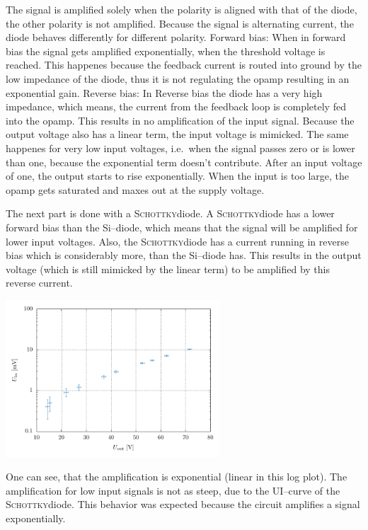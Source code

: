 \documentclass[a4paper,10pt]{article}
\newenvironment{Figure}
        {\par\medskip\noindent\minipage{\linewidth}}
        {\endminipage\par\medskip} %
\numberwithin{equation}{section}
\begin{document}
\begin{multicols}{2}
        The signal is amplified solely when the polarity is aligned with that of the diode, the other polarity is not amplified.
        Because the signal is alternating current, the diode behaves differently for different polarity.
        Forward bias: 
        When in forward bias the signal gets amplified exponentially, when the threshold voltage is reached.
        This happenes because the feedback current is routed into ground by the low impedance of the diode, thus it is not regulating the opamp resulting in an exponential gain.
        Reverse bias: 
        In Reverse bias the diode has a very high impedance, which means, the current from the feedback loop is completely fed into the opamp.
        This results in no amplification of the input signal.
        Because the output voltage also has a linear term, the input voltage is mimicked.
        The same happenes for very low input voltages, i.e.\ when the signal passes zero or is lower than one, because the exponential term doesn't contribute.
        After an input voltage of one, the output starts to rise exponentially.
        When the input is too large, the opamp gets saturated and maxes out at the supply voltage.\par
        The next part is done with a \textsc{Schottky}diode.
        A \textsc{Schottky}diode has a lower forward bias than the Si--diode, which means that the signal will be amplified for lower input voltages.
        Also, the \textsc{Schottky}diode has a current running in reverse bias which is considerably more, than the Si--diode has.
        This results in the output voltage (which is still mimicked by the linear term) to be amplified by this reverse current.
        \begin{Figure}
                \centering
                \includegraphics[width=0.6\textwidth]{../plot/6_1_2_crop.pdf}
        \end{Figure}
        \noindent One can see, that the amplification is exponential (linear in this log plot).
        The amplification for low input signals is not as steep, due to the UI--curve of the \textsc{Schottky}diode.
        This behavior was expected because the circuit amplifies a signal exponentially.



\end{multicols}
\end{document}
